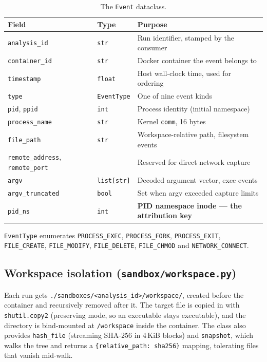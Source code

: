 \documentclass[11pt,a4paper]{article}
\newcommand{\code}[1]{\texttt{\small #1}}
\newcommand{\file}[1]{\texttt{\small #1}}
\begin{document}
\begin{table}[H]
\centering\footnotesize
\begin{tabular}{@{}llp{74mm}@{}}
\toprule
\textbf{Field} & \textbf{Type} & \textbf{Purpose} \\
\midrule
\code{analysis\_id}    & \code{str}  & Run identifier, stamped by the consumer \\
\code{container\_id}   & \code{str}  & Docker container the event belongs to \\
\code{timestamp}       & \code{float}& Host wall-clock time, used for ordering \\
\code{type}            & \code{EventType} & One of nine event kinds \\
\code{pid}, \code{ppid}& \code{int}  & Process identity (initial namespace) \\
\code{process\_name}   & \code{str}  & Kernel \code{comm}, 16 bytes \\
\code{file\_path}      & \code{str}  & Workspace-relative path, filesystem events \\
\code{remote\_address}, \code{remote\_port} & & Reserved for direct network capture \\
\code{argv}            & \code{list[str]} & Decoded argument vector, exec events \\
\code{argv\_truncated} & \code{bool} & Set when argv exceeded capture limits \\
\code{pid\_ns}         & \code{int}  & \textbf{PID namespace inode --- the attribution key} \\
\bottomrule
\end{tabular}
\caption{The \code{Event} dataclass.}
\end{table}

\code{EventType} enumerates \code{PROCESS\_EXEC}, \code{PROCESS\_FORK},
\code{PROCESS\_EXIT}, \code{FILE\_CREATE}, \code{FILE\_MODIFY},
\code{FILE\_DELETE}, \code{FILE\_CHMOD} and \code{NETWORK\_CONNECT}.

\subsection{Workspace isolation (\file{sandbox/workspace.py})}
Each run gets \file{./sandboxes/<analysis\_id>/workspace/}, created before the
container and recursively removed after it. The target file is copied in with
\code{shutil.copy2} (preserving mode, so an executable stays executable), and the
directory is bind-mounted at \file{/workspace} inside the container. The class also
provides \code{hash\_file} (streaming SHA-256 in 4\,KiB blocks) and
\code{snapshot}, which walks the tree and returns a
\code{\{relative\_path: sha256\}} mapping, tolerating files that vanish mid-walk.
\end{document}
